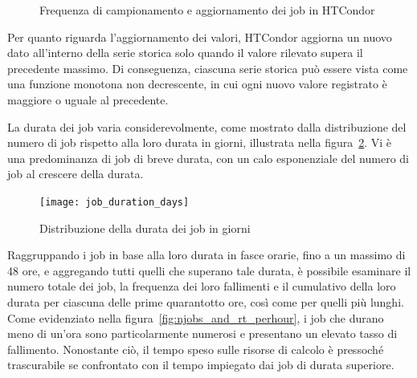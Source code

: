 \begin{figure}[p]
   \centering 
   \caption{\small Frequenza di campionamento e aggiornamento dei job in HTCondor}
   \label{fig:htcondor_sampling}
\end{figure}

Per quanto riguarda l'aggiornamento dei valori, HTCondor aggiorna un nuovo
dato all'interno della serie storica solo quando il valore rilevato supera il
precedente massimo. Di conseguenza, ciascuna serie storica può essere vista
come una funzione monotona non decrescente, in cui ogni nuovo valore
registrato è maggiore o uguale al precedente.

La durata dei job varia considerevolmente, come mostrato dalla distribuzione
del numero di job rispetto alla loro durata in giorni, illustrata nella
figura~\ref{fig:job_duration_days}. Vi è una predominanza di job di breve
durata, con un calo esponenziale del numero di job al crescere della durata.

\begin{figure}[!ht]
   \centering
   \texttt{[image: job\_duration\_days]}
   \caption{Distribuzione della durata dei job in giorni}
   \label{fig:job_duration_days}
\end{figure}

Raggruppando i job in base alla loro durata in fasce orarie, fino a un massimo
di 48 ore, e aggregando tutti quelli che superano tale durata, è possibile
esaminare il numero totale dei job, la frequenza dei loro fallimenti e il
cumulativo della loro durata per ciascuna delle prime quarantotto ore, così
come per quelli più lunghi. Come evidenziato nella
figura~\ref{fig:njobs_and_rt_perhour}, i job che durano meno di un'ora sono
particolarmente numerosi e presentano un elevato tasso di fallimento.
Nonostante ciò, il tempo speso sulle risorse di calcolo è pressoché
trascurabile se confrontato con il tempo impiegato dai job di durata
superiore.

